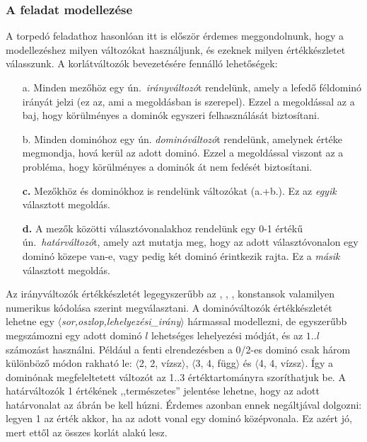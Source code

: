 \subsubsection{A feladat modellezése}

A torpedó feladathoz hasonlóan itt is először érdemes meggondolnunk, hogy a modellezéshez
milyen változókat használjunk, és ezeknek milyen értékkészletet válasszunk. A korlátváltozók
bevezetésére fennálló lehetőségek:

\begin{itemize}
\item[a.] Minden mezőhöz egy ún.\ \emph{irányváltozó}t rendelünk, amely a
    lefedő féldominó irányát jelzi (ez az, ami a megoldásban is szerepel).
    Ezzel a megoldással az a baj, hogy körülményes a dominók egyszeri
    felhasználását biztosítani.
\item[b.] Minden dominóhoz egy ún. \emph{dominóváltozó}t rendelünk,
    amelynek értéke megmondja, hová kerül az adott dominó. Ezzel a megoldással
    viszont az a probléma, hogy körülményes a dominók át nem fedését biztosítani. 
\item[{\bf c.}] Mezőkhöz és dominókhoz is rendelünk változókat (a.+b.). Ez az
    \emph{egyik} választott megoldás.
\item[{\bf d.}] A mezők közötti választóvonalakhoz rendelünk egy 0-1 értékű ún.\
\emph{határváltozó}t, amely azt mutatja meg, hogy az adott választóvonalon egy
dominó közepe van-e, vagy pedig két dominó érintkezik rajta. Ez a \emph{másik}
    választott megoldás.
\end{itemize}

Az irányváltozók értékkészletét legegyszerűbb az , , , 
konstansok valamilyen numerikus kódolása szerint megválasztani. A dominóváltozók
értékkészletét lehetne egy $\langle${\em sor,oszlop,lehelyezési\_irány}$\rangle$
hármassal modellezni, de egyszerűbb megszámozni egy adott dominó $l$ lehetséges
lehelyezési módját, és az $1..l$ számozást használni. Például a fenti elrendezésben
a 0/2-es dominó csak három különböző módon rakható le: $\langle$2, 2, vízsz$\rangle$,
$\langle$3, 4, függ$\rangle$ és $\langle$4, 4, vízsz$\rangle$. Így a dominónak
megfeleltetett változót az 1..3 értéktartományra szoríthatjuk be. A határváltozók
1 értékének ,,természetes'' jelentése lehetne, hogy az adott határvonalat az ábrán
be kell húzni. Érdemes azonban ennek negáltjával dolgozni: legyen 1 az érték akkor,
ha az adott vonal egy dominó középvonala. Ez azért jó, mert ettől az összes korlát
\cd{A+B+... \#= 1} alakú lesz.

